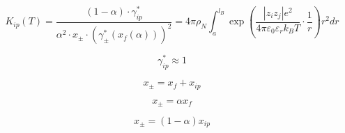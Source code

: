 \documentclass[12pt, letterpaper]{article}
\begin{document}
\begin{equation}
    K_{ip}(T)=\frac{(1-\alpha)\cdot\gamma_{ip}^{*}}{\alpha^{2}\cdot x_{\pm}\cdot\left(\gamma_{\pm}^{*}(x_{f}(\alpha))\right)^{2}} = 4\pi\rho_{N}\int_{a}^{l_{B}}\exp\left(\frac{\left|z_{i}z_{j}\right|e^2}{4\pi\varepsilon_{0}\varepsilon_{r}k_{B}T}\cdot\frac{1}{r}\right)r^2dr
    \label{eq:k_ion_pair}
\end{equation}


\begin{equation}
    \gamma_{ip}^* \approx 1
    \label{eq:gamma_ion_pair_unity}
\end{equation}


\begin{equation}
    x_{\pm} = x_{f} + x_{ip}
    \label{eq:x_pm_balance}
\end{equation}


\begin{equation}
    x_{\pm} = \alpha x_{f}
    \label{eq:x_free_ion_from_alpha}
\end{equation}


\begin{equation}
    x_{\pm} = (1 - \alpha) x_{ip}
    \label{eq:x_ion_pair_from_alpha}
\end{equation}
\end{document}
